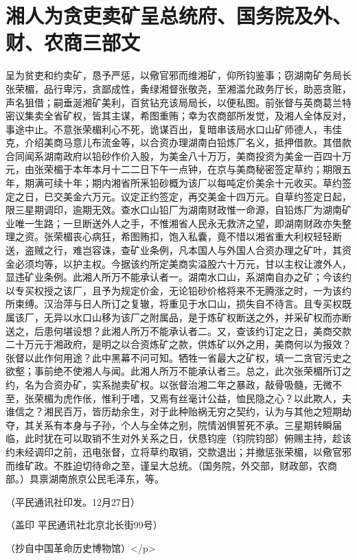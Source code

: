 \section{湘人为贪吏卖矿呈总统府、国务院及外、财、农商三部文}



呈为贫吏和约卖矿，恳予严惩，以儆官邪而维湘矿，仰所钧鉴事；窃湖南矿务局长张荣楣，品行卑污，贪鄙成性，夤绿湘督张敬尧，至湘滥允政务厅长，助恶贪赃，声名狙借；嗣垂涎湘矿美利，百贫钻充该局局长，以便私图。前张督与英商葛兰特密议集卖全省矿权，皆其主谋，希图重贿；幸为农商部所发觉，及湘人全体反对，事途中止。不意张荣楣利心不死，诡谋百出，复暗串该局水口山矿师德人，韦佳克，介绍美商马意儿布流金等，以合资办理湖南白铅炼厂名义，抵押借款。其借款合同闻系湖南政府以铅砂作价入股，为美金八十万万，美商投资为美金一百四十万元，由张荣楣于本年本月十二二日下午一点钟，在京与美商秘密签定草约；期限五年，期满可续十年；期内湘省所釆铅砂概为该厂以每吨定价美余十元收买。草约签定之日，已交美金六万元。议定正约签定，再交美金十四万元。自草约签定日起，限三星期调印，逾期无效。查水口山铅厂为湖南财政惟一命源，自铅炼厂为湖南矿业唯一生路；一旦断送外人之手，不惟湘省人民永无救济之望，即湖南财政亦失整理之资。张荣楣丧心病狂，希图贿扣，饱入私囊，竟不惜以湘省重大利权轻轻断送，盗贼之行，难岂容诛，查矿业条例，凡本国人与外国人合资办理之矿叶，其资金必须均等，以护主权。今据该约所定美商实溢股六十万元，甘以主权让渡外人，显违矿业条例。此湘人所万不能承认者一。湖南水口山，系湖南自办之矿；今该约以专买权授之该厂，且予为规定价金，无论铅砂价格将来不无腾涨之时，一为该约所束缚。汉治萍与日人所订之复辙，将重见于水口山，损失自不待言。且专买权既属该厂，无异以水口山移为该厂之附属品，是于炼矿权断送之外，并采矿权而亦断送之，后患何堪设想？此湘人所万不能承认者二。又，查该约订定之日，美商交款二十万元于湘政府，是明之以合资炼矿之款，供炼矿以外之用，美商何以为报效？张督以此作何用途？此中黑幕不问可知。牺牲一省最大之矿权，填一二贪官污史之欲壑；事前绝不使湘人与闻。此湘人所万不能承认者三。总之，此次张荣楣所订之约，名为合资办矿，实系抛卖矿权。以张督治湘二年之暴政，敲骨吸髓，无微不至，张荣楣为虎作伥，惟利于嗜，又焉有丝毫计公益，恤民隐之心？以此欺人，夫谁信之？湘民百万，皆历劫余生，对于此种贻祸无穷之契约，认为与其他之短期劫夺，其关系有本身与子孙，个人与全体之别，院情汹惧誓死不承。三星期转瞬届临，此时犹在可以取销不生对外关系之日，伏恳钧座（钧院钧部）俯赐主持，趁该约未经调印之前，迅电张督，立将草约取销，交款退出；并撤惩张荣楣，以儆官邪而维矿政。不胜迫切待命之至，谨呈大总统。（国务院，外交部，财政部，农商部。）具禀湖南旅京公民毛泽东，等。

\begin{flushright}（平民通讯社印发。12月27日）\end{flushright}

（盖印 平民通讯社北京北长街99号）

（抄自中国革命历史博物馆）</p>

